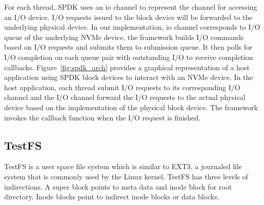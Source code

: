 For each thread, SPDK uses an io channel to represent the channel for accessing an 
I/O device. I/O requests issued to the block device will be forwarded to the underlying
physical device. In our implementation, io channel corresponds to I/O queue 
of the underlying NVMe device, the framework builds I/O commands based on I/O 
requests and submits them to submission queue. It then polls for I/O completion
on each queue pair with outstanding I/O to receive completion callbacks.  
Figure~\ref{fig:spdk_arch} provides a graphical
representation of a host application using SPDK block devices to interact with
an NVMe device. In the host application, each thread submit I/O requests to its
corresponding I/O channel and the I/O channel forward the I/O requests to the 
actual physical device based on the implementation of the physical block device.
The framework invokes the callback function when the I/O request is finished.

\subsection{TestFS}
TestFS\cite{testfs} is a user space file system which is similar to EXT3, a
journaled file system that is commonly used by the Linux kernel. TestFS
has three levels of indirections. A super block points to meta data and inode 
block for root directory. Inode blocks point to indirect inode blocks or 
data blocks.
